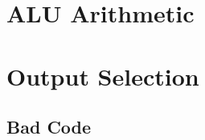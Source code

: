 \documentclass[a4paper,11pt]{article}
\begin{document}
\section{ALU Arithmetic}


\section{Output Selection}

\subsection{Bad Code}
\end{document}
